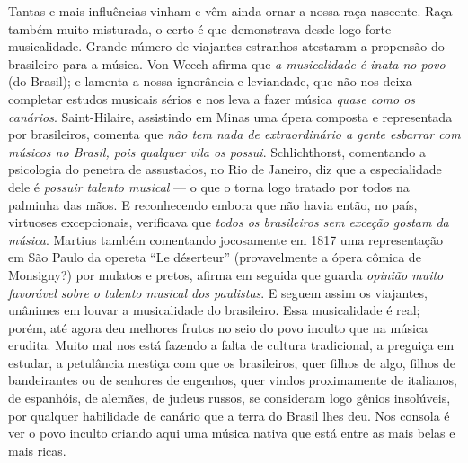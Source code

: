 Tantas e mais influências vinham e vêm ainda ornar a nossa raça
nascente. Raça também muito misturada, o certo é que demonstrava desde
logo forte musicalidade. Grande número de viajantes estranhos atestaram
a propensão do brasileiro para a música. Von Weech afirma que \textit{a
musicalidade é inata no povo} (do Brasil); e lamenta a nossa ignorância
e leviandade, que não nos deixa completar estudos musicais sérios e nos
leva a fazer música \textit{quase como os canários}. Saint-Hilaire,
assistindo em Minas uma ópera composta e representada por brasileiros,
comenta que \textit{não tem nada de extraordinário a gente esbarrar com
músicos no Brasil, pois qualquer vila os possui}. Schlichthorst,
comentando a psicologia do penetra de assustados, no Rio de Janeiro, diz
que a especialidade dele é \textit{possuir talento musical} --- o que o torna
logo tratado por todos na palminha das mãos. E reconhecendo embora que
não havia então, no país, virtuoses excepcionais, verificava que \textit{todos
os brasileiros sem exceção gostam da música}. Martius também comentando
jocosamente em 1817 uma representação em São Paulo da opereta ``Le
déserteur'' (provavelmente a ópera cômica de Monsigny?) por mulatos e
pretos, afirma em seguida que guarda \textit{opinião muito favorável sobre o
talento musical dos paulistas}. E seguem assim os viajantes, unânimes
em louvar a musicalidade do brasileiro. Essa musicalidade é real; porém,
até agora deu melhores frutos no seio do povo inculto que na música
erudita. Muito mal nos está fazendo a falta de cultura tradicional, a
preguiça em estudar, a petulância mestiça com que os brasileiros, quer
filhos de algo, filhos de bandeirantes ou de senhores de engenhos, quer
vindos proximamente de italianos, de espanhóis, de alemães, de judeus
russos, se consideram logo gênios insolúveis, por qualquer habilidade de
canário que a terra do Brasil lhes deu. Nos consola é ver o povo inculto
criando aqui uma música nativa que está entre as mais belas e mais
ricas.

